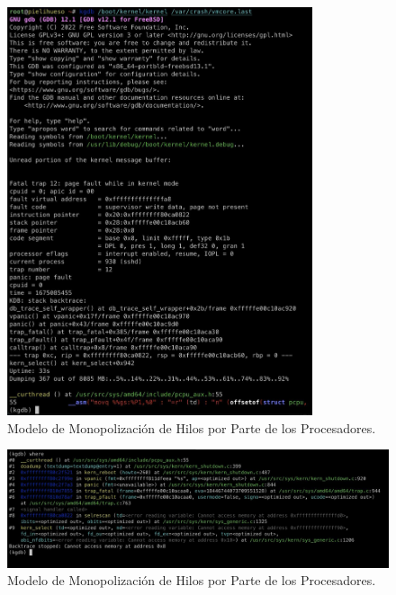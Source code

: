 \begin{figure}[H]
    \centering
    \includegraphics[width=0.8\textwidth]{images/kgdb_init.jpeg}
    \caption{Modelo de Monopolización de Hilos por Parte de los Procesadores.}
    \label{fig:kgdb_init}
\end{figure}

\vspace{.50cm}
\begin{figure}[H]
    \centering
    \includegraphics[width=1\textwidth]{images/kgdb_where.jpeg}
    \caption{Modelo de Monopolización de Hilos por Parte de los Procesadores.}
    \label{fig:kgdb_where}
\end{figure}

